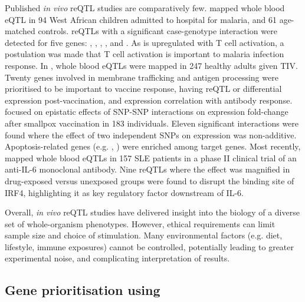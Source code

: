 \begin{outline}
Published \textit{in vivo} \gls{reQTL} studies are comparatively few.
\textcite{idaghdour2012EvidenceAdditiveInteraction} mapped whole blood \gls{eQTL} in 94 West African children admitted to hospital for malaria, and 61 age-matched controls.
\glspl{reQTL} with a significant case-genotype interaction were detected for five genes:
, , , , and .
As  is upregulated with T cell activation, a postulation was made that T cell activation is important to malaria infection response.
In \textcite{franco2013IntegrativeGenomicAnalysis}, whole blood \glspl{eQTL} were mapped in 247 healthy adults given \gls{TIV}.
Twenty genes involved in membrane trafficking and antigen processing were prioritised to be important to vaccine response,
having \gls{reQTL} or differential expression post-vaccination, and expression correlation with antibody response.
\textcite{lareau2016InteractionQuantitativeTrait} focused on epistatic effects of \gls{SNP}-\gls{SNP} interactions on expression fold-change after smallpox vaccination in 183 individuals.
Eleven significant interactions were found where the effect of two independent \glspl{SNP} on expression was non-additive.
Apoptosis-related genes (e.g. , ) were enriched among target genes.
Most recently, \textcite{davenport2018DiscoveringVivoCytokineeQTL}
mapped whole blood \glspl{eQTL} in 157 \gls{SLE} patients in a phase II clinical trial of an anti-IL-6 monoclonal antibody.
Nine \glspl{reQTL} where the effect was magnified in drug-exposed versus unexposed groups
were found to disrupt the binding site of IRF4,
highlighting it as key regulatory factor downstream of IL-6.

Overall, \textit{in vivo} \gls{reQTL} studies have delivered insight into the biology of a diverse set of whole-organism phenotypes.
However, ethical requirements can limit sample size and choice of stimulation.
Many environmental factors (e.g. diet, lifestyle, immune exposures) cannot be controlled, 
potentially leading to greater experimental noise, and complicating interpretation of results.

\subsection{Gene prioritisation using }
\label{subsec:intro_genePrioritisationUsingeQTL}


\end{outline}
